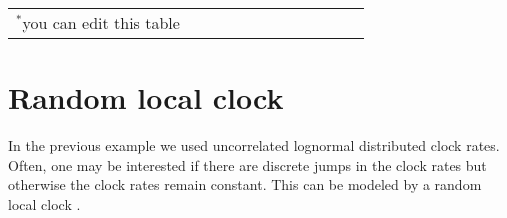\begin{Form}
\begin{table}[h!]
{\begin{tabular}{l c c c c c c c c c c c}
\hline
{\footnotesize{$^*$you can edit this table}}\\
\end{tabular}%
}
\label{tab:divergence_times}
\end{table}
\end{Form}



\newpage
\section{Random local clock}\label{sec:RLC}

In the previous example we used uncorrelated lognormal distributed clock rates.
Often, one may be interested if there are discrete jumps in the clock rates but otherwise the clock rates remain constant.
This can be modeled by a random local clock \citep{Drummond2010}.

